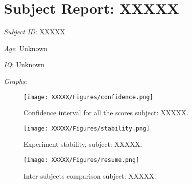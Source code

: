 \section{Subject Report: XXXXX}

\emph{Subject ID}: XXXXX

\emph{Age}: Unknown

\emph{IQ}: Unknown

\emph{Graphs}:

\begin{figure}[h!]
\centering
\texttt{[image: XXXXX/Figures/confidence.png]}
\caption{Confidence interval for all the scores subject: XXXXX.}
\end{figure}

\begin{figure}[h!]
\centering
\texttt{[image: XXXXX/Figures/stability.png]}
\caption{Experiment stability, subject: XXXXX.}
\end{figure}

\begin{figure}[h!]
\centering
\texttt{[image: XXXXX/Figures/resume.png]}
\caption{Inter subjects comparison subject: XXXXX.}
\end{figure}
\clearpage